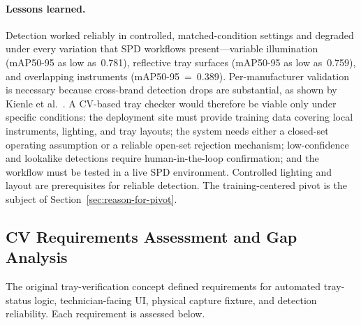 \documentclass[10pt,a4paper]{article}
\begin{document}
\paragraph{Lessons learned.}
\label{sec:boundary-conditions-for-future-cv-work}
Detection worked reliably in controlled, matched-condition settings and degraded under
every variation that SPD workflows present---variable illumination
(mAP50-95 as low as~0.781), reflective tray surfaces (mAP50-95 as low
as~0.759), and overlapping instruments (mAP50-95~=~0.389). Per-manufacturer
validation is necessary because cross-brand detection drops are substantial,
as shown by Kienle et al.\ \cite{kienle-et-al-2025}. A CV-based tray checker
would therefore be viable only under specific conditions: the deployment site
must provide training data covering local instruments, lighting, and tray
layouts; the system needs either a closed-set operating assumption or a
reliable open-set rejection mechanism; low-confidence and lookalike detections
require human-in-the-loop confirmation; and the workflow must be tested in a
live SPD environment. Controlled lighting and layout are prerequisites for
reliable detection. The training-centered pivot is the subject of
Section~\ref{sec:reason-for-pivot}.

\subsection{CV Requirements Assessment and Gap Analysis}
\label{sec:cv-gap-analysis}

The original tray-verification concept defined requirements for automated
tray-status logic, technician-facing UI, physical capture fixture, and
detection reliability. Each requirement is assessed below.
\end{document}
